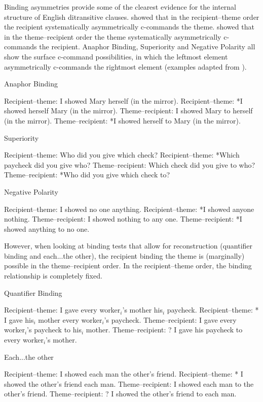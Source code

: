 Binding asymmetries provide some of the clearest evidence for the internal structure of English ditransitive clauses. \cite{Barss.1986} showed that in the recipient--theme order the recipient systematically asymmetrically c-commands the theme. \cite{Aoun.1989} showed that in the theme--recipient order the theme systematically asymmetrically c-commands the recipient.  Anaphor Binding, Superiority and Negative Polarity all show the surface c-command possibilities, in which the leftmost element asymmetrically c-commands the rightmost element (examples adapted from \cite{Aoun.1989}).
\newpage
\begin{exe}
\ex Anaphor Binding
\begin{xlist}
\ex Recipient--theme: I showed Mary herself (in the mirror).
\ex Recipient--theme: *I showed herself Mary (in the mirror).
\ex Theme--recipient: I showed Mary to herself (in the mirror).
\ex Theme--recipient: *I showed herself to Mary (in the mirror).
\end{xlist}
\ex Superiority
\begin{xlist}
\ex Recipient--theme: Who did you give which check?
\ex Recipient--theme: *Which paycheck did you give who?
\ex Theme--recipient: Which check did you give to who?
\ex Theme--recipient: *Who did you give which check to?
\end{xlist}
\ex Negative Polarity
\begin{xlist}
\ex Recipient--theme: I showed no one anything.
\ex Recipient--theme: *I showed anyone nothing.
\ex Theme--recipient: I showed nothing to any one.
\ex Theme--recipient: *I showed anything to no one.
\end{xlist}
\end{exe}

However, when looking at binding tests that allow for reconstruction (quantifier binding and each...the other), the recipient binding the theme is (marginally) possible in the theme--recipient order. In the recipient--theme order, the binding relationship is completely fixed. 

\begin{exe}
\ex Quantifier Binding
\begin{xlist}
\ex Recipient--theme: I gave every worker$_i$'s mother his$_i$ paycheck.
\ex Recipient--theme: * I gave his$_i$ mother every worker$_i$'s paycheck.
\ex Theme--recipient: I gave every worker$_i$'s paycheck to his$_i$ mother.
\ex Theme--recipient: ? I gave his paycheck to every worker$_i$'s mother.
\end{xlist}

\ex Each...the other
\begin{xlist}
\ex Recipient--theme: I showed each man the other's friend.
\ex Recipient--theme: * I showed the other's friend each man.
\ex Theme--recipient: I showed each man to the other's friend.
\ex Theme--recipient: ? I showed the other's friend to each man.
\end{xlist}
\end{exe}

